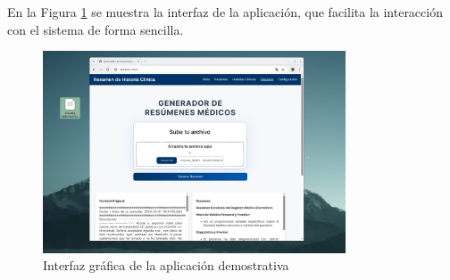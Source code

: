\documentclass[../main.tex]{subfiles}
\begin{document}
En la Figura \ref{fig:demo_app} se muestra la interfaz de la aplicación, que facilita la interacción con el sistema de forma sencilla. 

\begin{figure}[H]
	\centering
	\includegraphics[width=0.8\textwidth]{images/app.png}
	\caption{Interfaz gráfica de la aplicación demostrativa}
	\label{fig:demo_app}
\end{figure}
\end{document}

